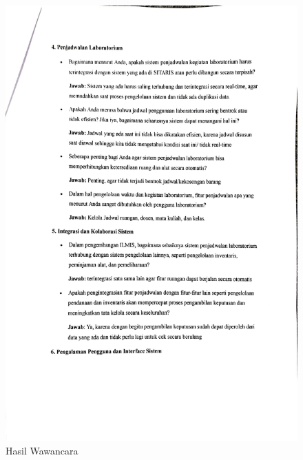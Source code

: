 \begin{figure}[h]
	\centering
	\includegraphics[width=0.82\linewidth]{konten/gambar/wawancara/wawancara_3.jpg}
	\caption{Hasil Wawancara}
	\label{fig:hasil-wawancara}
\end{figure}
